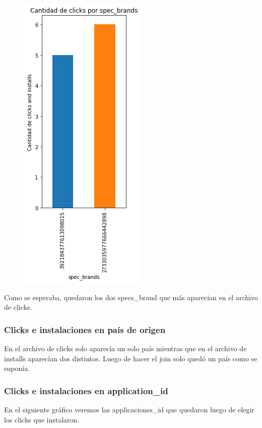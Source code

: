 \documentclass[a4paper, 12pt]{article}
\newcommand\tab[1][1cm]{\hspace*{#1}}
\begin{document}
{{	\FloatBarrier
		\begin{figure}[h]
			\centering
			\includegraphics[scale = 0.5]{images/clicks-installs/specs_brand.png}
			\caption{}
		\end{figure}
	\FloatBarrier

	\tab Como se esperaba, quedaron los dos specs\_brand que más aparecian en el archivo de clicks.
	
	\subsubsection{Clicks e instalaciones en país de origen}
	\tab En el archivo de clicks solo aparecía un solo país mientras que en el archivo de installs aparecían dos distintos. Luego de hacer el join solo quedó un país como se suponía.
	
	\subsubsection{Clicks e instalaciones en application\_id}
	\tab En el siguiente gráfico veremos las applicaciones\_id que quedaron luego de elegir los clicks que instalaron.
	
}}
\end{document}
